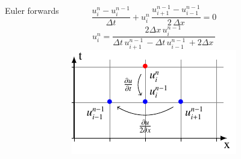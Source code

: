 \begin{frame}
  \begin{columns}
    Euler forwards

  $$\frac{u_{i}^{n}-u_{i}^{n-1}}{\Delta t}+ u_{i}^{n}\, \frac{u_{i+1}^{n-1}-u_{i-1}^{n-1}}{2\,\Delta x}=0$$
  $$ u_{i}^{n} = \frac{2 \Delta{x}\, u^{n-1}_{i}\,}{\Delta{t}\, u^{n-1}_{i+1}\, - \Delta{t}\, u^{n-1}_{i-1}\, + 2 \Delta{x}\,}$$
    \includegraphics[width=\linewidth]{../BurgersEquation/tikz/linear4/linear4.pdf}\\
  \end{columns}
\end{frame}


